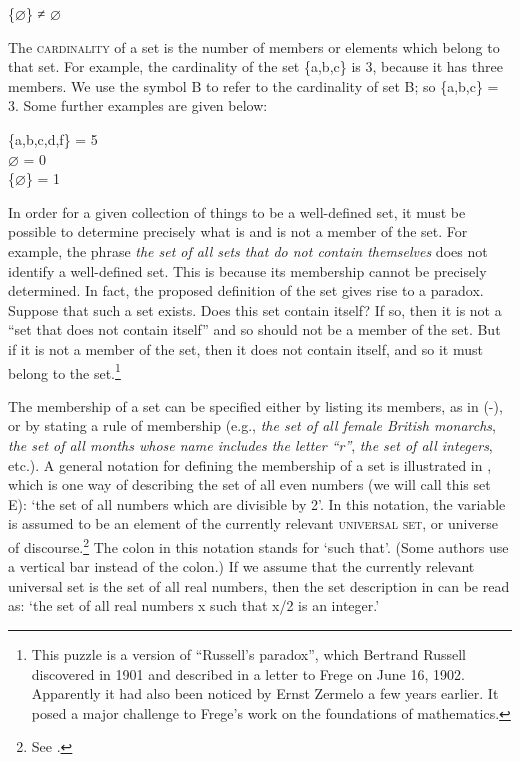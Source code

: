 \ea
  \{⌀\} ≠ ⌀
\z


The \textsc{cardinality} of a set is the number of members or elements which belong to that set. For example, the cardinality of the set \{a,b,c\} is 3, because it has three members. We use the symbol {\textbar}B{\textbar} to refer to the cardinality of set B; so {\textbar}\{a,b,c\}{\textbar} = 3. Some further examples are given below:


\ea
{\textbar}\{a,b,c,d,f\}{\textbar} = 5\\
{\textbar}⌀{\textbar} = 0\\
{\textbar}\{⌀\}{\textbar} = 1
\z


In order for a given collection of things to be a well-defined set, it must be possible to determine precisely what is and is not a member of the set. For example, the phrase \textit{the set of all sets that do not contain themselves} does not identify a well-defined set. This is because its membership cannot be precisely determined. In fact, the proposed definition of the set gives rise to a paradox. Suppose that such a set exists. Does this set contain itself? If so, then it is not a “set that does not contain itself” and so should not be a member of the set. But if it is not a member of the set, then it does not contain itself, and so it must belong to the set.\footnote{This puzzle is a version of “Russell’s paradox”, which Bertrand Russell discovered in 1901 and described in a letter to Frege on June 16, 1902. Apparently it had also been noticed by Ernst Zermelo a few years earlier. It posed a major challenge to Frege’s work on the foundations of mathematics.}



The membership of a set can be specified either by listing its members, as in (-), or by stating a rule of membership (e.g., \textit{the set of all female British monarchs}, \textit{the set of all months whose name includes the letter “r”}, \textit{the set of all integers}, etc.). A general notation for defining the membership of a set is illustrated in , which is one way of describing the set of all even numbers (we will call this set E): ‘the set of all numbers which are divisible by 2’. In this notation, the variable is assumed to be an element of the currently relevant \textsc{universal set}, or universe of discourse.\footnote{See .} The colon in this notation stands for ‘such that’. (Some authors use a vertical bar {\textbar} instead of the colon.) If we assume that the currently relevant universal set is the set of all real numbers, then the set description in  can be read as: ‘the set of all real numbers x such that x/2 is an integer.’


